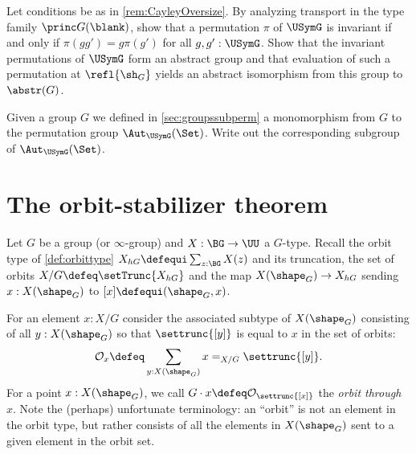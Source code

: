 \begin{xca}\label{xca:PP-invariant-permutations} 
Let conditions be as in \cref{rem:CayleyOversize}.
By analyzing transport in the type family $\princ G(\blank)$,
show that a permutation $\pi$ of $\USymG$
is invariant if and only if $\pi(gg')=g\pi(g')$ for all $g,g':\USymG$.
Show that the invariant permutations of $\USymG$ form an abstract group
and that evaluation of such a permutation at $\refl{\sh_G}$
yields an abstract isomorphism from this group to $\abstr(G)$.
\end{xca}
  

\begin{xca} 
    Given a group $G$ we defined in \cref{sec:groupssubperm} a monomorphism from $G$ to the permutation group $\Aut_{\USymG}(\Set)$. Write out the corresponding subgroup of $\Aut_{\USymG}(\Set)$.
  \end{xca}

\section{The orbit-stabilizer theorem}
\label{sec:orbit-stabilizer-theorem}


Let $G$ be a group (or $\infty$-group) and  $X : \BG \to \UU$  a $G$-type.
Recall the orbit type of \cref{def:orbittype} $X_{hG}\defequi
\sum_{z:\BG}X(z)$ and its truncation, the set of orbits $X / G \defeq \setTrunc{X_{hG}}$ and the map $X(\shape_G)\to X_{hG}$ sending $x:X(\shape_G)$ to $[x]\defequi (\shape_G,x)$.


For an element $x:X/G$ consider the associated subtype of $X(\shape_G)$ consisting of
 all $y : X(\shape_G)$ so that $\settrunc{[y]}$ is equal to $x$ in the set of orbits:
\[
  \mathcal O_{x} \defeq \sum_{y : X(\shape_G)} x =_{X/G} \settrunc{[y]}.
\]
 For a point $x : X(\shape_G)$, we call $G\cdot x \defeq \mathcal O_{\settrunc{[x]}}$ 
 the \emph{orbit through $x$}.
Note the (perhaps) unfortunate terminology: an ``orbit'' is not an element in the
orbit type, but rather consists of all the elements in $X(\shape_G)$ sent to a given element in the orbit set.

